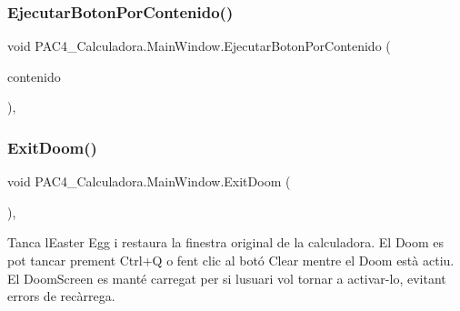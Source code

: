 \subsubsection{\texorpdfstring{Ejecutar\+Boton\+Por\+Contenido()}{EjecutarBotonPorContenido()}\hspace{0.1cm}{\footnotesize\ttfamily [2/2]}}
{\footnotesize\ttfamily void P\+A\+C4\+\_\+\+Calculadora.\+Main\+Window.\+Ejecutar\+Boton\+Por\+Contenido (\begin{DoxyParamCaption}\item[{string}]{contenido }\end{DoxyParamCaption})\hspace{0.3cm}{\ttfamily [inline]}, {\ttfamily [private]}}

\mbox{\label{class_p_a_c4___calculadora_1_1_main_window_a1b0f5b87aa37a064fb973e1cd3910816}} 
\subsubsection{\texorpdfstring{Exit\+Doom()}{ExitDoom()}\hspace{0.1cm}{\footnotesize\ttfamily [1/2]}}
{\footnotesize\ttfamily void P\+A\+C4\+\_\+\+Calculadora.\+Main\+Window.\+Exit\+Doom (\begin{DoxyParamCaption}{ }\end{DoxyParamCaption})\hspace{0.3cm}{\ttfamily [inline]}, {\ttfamily [private]}}



Tanca l\textquotesingle{}Easter Egg i restaura la finestra original de la calculadora. El Doom es pot tancar prement Ctrl+Q o fent clic al botó Clear mentre el Doom està actiu. ~\newline
El Doom\+Screen es manté carregat per si l\textquotesingle{}usuari vol tornar a activar-\/lo, evitant errors de recàrrega. 

\mbox{\label{class_p_a_c4___calculadora_1_1_main_window_a1b0f5b87aa37a064fb973e1cd3910816}} 
